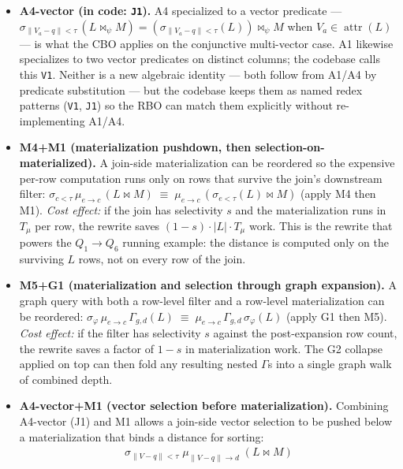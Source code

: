 \documentclass[sigconf,nonacm,review]{acmart}
\theoremstyle{plain}
\theoremstyle{definition}
\newcommand{\attr}[1]{\operatorname{attr}(#1)}
\theoremstyle{remark}
\begin{document}
\begin{itemize}[leftmargin=*]
  \item \textbf{A4-vector (in code: \texttt{J1}).} A4 specialized
    to a vector predicate ---
    $\sigma_{\lVert V_a - q \rVert < \tau}\,(L \bowtie_\psi M) =
    (\sigma_{\lVert V_a - q \rVert < \tau}(L)) \bowtie_\psi M$
    when $V_a \in \attr{L}$ --- is what the CBO applies on the
    conjunctive multi-vector case. A1 likewise specializes to
    two vector predicates on distinct columns; the codebase
    calls this \texttt{V1}. Neither is a new algebraic identity
    --- both follow from A1/A4 by predicate substitution ---
    but the codebase keeps them as named redex patterns
    (\texttt{V1}, \texttt{J1}) so the RBO can match them
    explicitly without re-implementing A1/A4.
  \item \textbf{M4+M1 (materialization pushdown, then
    selection-on-materialized).} A join-side materialization
    can be reordered so the expensive per-row computation runs
    only on rows that survive the join's downstream filter:
    $\sigma_{c<\tau}\,\mu_{e\to c}\,(L\bowtie M) \;\equiv\;
    \mu_{e\to c}\,(\sigma_{e<\tau}(L)\bowtie M)$ (apply M4 then
    M1). \emph{Cost effect:} if the join has selectivity $s$
    and the materialization runs in $T_\mu$ per row, the rewrite
    saves $(1 - s) \cdot |L| \cdot T_\mu$ work. This is the
    rewrite that powers the $Q_1 \to Q_6$ running example:
    the distance is computed only on the surviving $L$ rows,
    not on every row of the join.
  \item \textbf{M5+G1 (materialization and selection through graph
    expansion).} A graph query with both a row-level filter and a
    row-level materialization can be reordered:
    $\sigma_\varphi\, \mu_{e\to c}\, \Gamma_{g,d}(L) \;\equiv\;
    \mu_{e\to c}\, \Gamma_{g,d}\, \sigma_\varphi(L)$ (apply G1
    then M5). \emph{Cost effect:} if the filter has selectivity
    $s$ against the post-expansion row count, the rewrite saves
    a factor of $1 - s$ in materialization work. The G2 collapse
    applied on top can then fold any resulting nested $\Gamma$s
    into a single graph walk of combined depth.
  \item \textbf{A4-vector+M1 (vector selection before materialization).}
    Combining A4-vector (J1) and M1 allows a join-side vector
    selection to be pushed below a materialization that binds a
    distance for sorting:
    \begin{align*}
      \sigma_{\lVert V-q\rVert<\tau}\; \mu_{\lVert V-q\rVert\to d}\; (L \bowtie M)

\end{align*}
\end{itemize}
\end{document}
